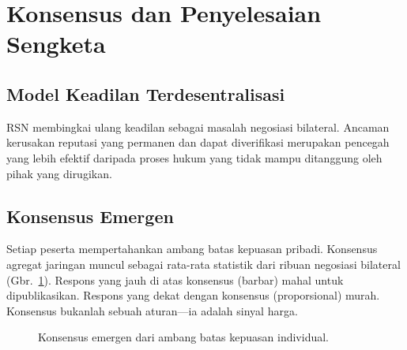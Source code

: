 \documentclass[11pt,a4paper,twocolumn]{article}
\begin{document}
\section{Konsensus dan Penyelesaian Sengketa}

\subsection{Model Keadilan Terdesentralisasi}

RSN membingkai ulang keadilan sebagai masalah negosiasi bilateral. Ancaman kerusakan reputasi yang permanen dan dapat diverifikasi merupakan pencegah yang lebih efektif daripada proses hukum yang tidak mampu ditanggung oleh pihak yang dirugikan.

\subsection{Konsensus Emergen}

Setiap peserta mempertahankan ambang batas kepuasan pribadi. Konsensus agregat jaringan muncul sebagai rata-rata statistik dari ribuan negosiasi bilateral (Gbr.~\ref{fig:consensus}). Respons yang jauh di atas konsensus (barbar) mahal untuk dipublikasikan. Respons yang dekat dengan konsensus (proporsional) murah. Konsensus bukanlah sebuah aturan---ia adalah sinyal harga.

\begin{figure}[ht]
\centering
{}
\caption{Konsensus emergen dari ambang batas kepuasan individual.}
\label{fig:consensus}
\end{figure}
\end{document}
